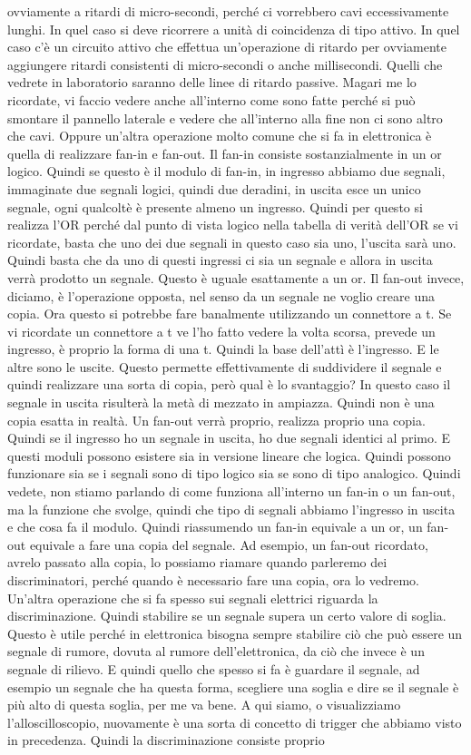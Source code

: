 ovviamente a ritardi di micro-secondi, perché ci vorrebbero cavi eccessivamente lunghi. In quel caso si deve ricorrere a unità di coincidenza di tipo attivo. In quel caso c'è un circuito attivo che effettua un'operazione di ritardo per ovviamente aggiungere ritardi consistenti di micro-secondi o anche millisecondi. Quelli che vedrete in laboratorio saranno delle linee di ritardo passive. Magari me lo ricordate, vi faccio vedere anche all'interno come sono fatte perché si può smontare il pannello laterale e vedere che all'interno alla fine non ci sono altro che cavi. Oppure un'altra operazione molto comune che si fa in elettronica è quella di realizzare fan-in e fan-out. Il fan-in consiste sostanzialmente in un or logico. Quindi se questo è il modulo di fan-in, in ingresso abbiamo due segnali, immaginate due segnali logici, quindi due deradini, in uscita esce un unico segnale, ogni qualcoltè è presente almeno un ingresso. Quindi per questo si realizza l'OR perché dal punto di vista logico nella tabella di verità dell'OR se vi ricordate, basta che uno dei due segnali in questo caso sia uno, l'uscita sarà uno. Quindi basta che da uno di questi ingressi ci sia un segnale e allora in uscita verrà prodotto un segnale. Questo è uguale esattamente a un or. Il fan-out invece, diciamo, è l'operazione opposta, nel senso da un segnale ne voglio creare una copia. Ora questo si potrebbe fare banalmente utilizzando un connettore a t. Se vi ricordate un connettore a t ve l'ho fatto vedere la volta scorsa, prevede un ingresso, è proprio la forma di una t. Quindi la base dell'attì è l'ingresso. E le altre sono le uscite. Questo permette effettivamente di suddividere il segnale e quindi realizzare una sorta di copia, però qual è lo svantaggio? In questo caso il segnale in uscita risulterà la metà di mezzato in ampiazza. Quindi non è una copia esatta in realtà. Un fan-out verrà proprio, realizza proprio una copia. Quindi se il ingresso ho un segnale in uscita, ho due segnali identici al primo. E questi moduli possono esistere sia in versione lineare che logica. Quindi possono funzionare sia se i segnali sono di tipo logico sia se sono di tipo analogico. Quindi vedete, non stiamo parlando di come funziona all'interno un fan-in o un fan-out, ma la funzione che svolge, quindi che tipo di segnali abbiamo l'ingresso in uscita e che cosa fa il modulo. Quindi riassumendo un fan-in equivale a un or, un fan-out equivale a fare una copia del segnale. Ad esempio, un fan-out ricordato, avrelo passato alla copia, lo possiamo riamare quando parleremo dei discriminatori, perché quando è necessario fare una copia, ora lo vedremo. Un'altra operazione che si fa spesso sui segnali elettrici riguarda la discriminazione. Quindi stabilire se un segnale supera un certo valore di soglia. Questo è utile perché in elettronica bisogna sempre stabilire ciò che può essere un segnale di rumore, dovuta al rumore dell'elettronica, da ciò che invece è un segnale di rilievo. E quindi quello che spesso si fa è guardare il segnale, ad esempio un segnale che ha questa forma, scegliere una soglia e dire se il segnale è più alto di questa soglia, per me va bene. A qui siamo, o visualizziamo l'alloscilloscopio, nuovamente è una sorta di concetto di trigger che abbiamo visto in precedenza. Quindi la discriminazione consiste proprio 